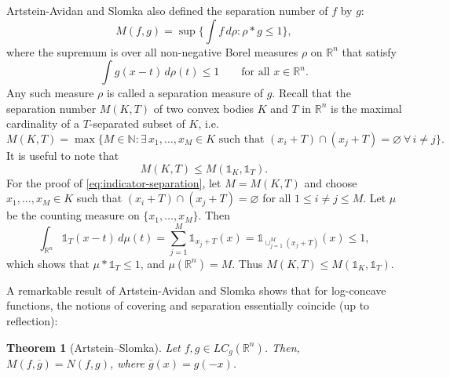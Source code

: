 \documentclass[11pt,leqno]{article}
\newtheorem{theorem}{Theorem}[section]
\theoremstyle{definition}
\theoremstyle{remark}
\numberwithin{equation}{section}
\newcommand{\ls}{\leqslant}
\begin{document}
Artstein-Avidan and Slomka \cite{Artstein-Slomka-2021} also defined the separation number of $f$ by $g$:
$$M(f,g)= \sup\Big\{\int f\, d\rho : \rho\ast g \ls 1\Big\},$$
where the supremum is over all non-negative Borel measures $\rho$ on $\mathbb{R}^n$ that satisfy
$$\int g(x-t)\, d\rho(t)\ls 1\qquad \text{for all } x\in\mathbb{R}^n.$$
Any such measure $\rho$ is called a separation measure of $g$.
Recall that the separation number $M(K,T)$ of two convex bodies $K$ and $T$ in
$\mathbb{R}^n$ is the maximal cardinality of a $T$-separated subset of $K$, i.e.
$$M(K,T)= \max\Big\{ M\in\mathbb{N} :\exists\, x_1,\ldots,x_M \in K
\text{ such that }(x_i+T)\cap(x_j+T)=\varnothing\ \forall\, i\neq j\Big\}.$$
It is useful to note that
\begin{equation}\label{eq:indicator-separation}
M(K,T)\ls M(\mathds{1}_K,\mathds{1}_T).
\end{equation}
For the proof of \eqref{eq:indicator-separation}, let $M=M(K,T)$ and choose
$x_1,\ldots ,x_M\in K$ such that $(x_i+T)\cap(x_j+T)=\varnothing$ for all $1\ls i\neq j\ls M$.
Let $\mu$ be the counting measure on $\{x_1,\ldots,x_M\}$. Then
$$\int_{\mathbb{R}^n}\mathds{1}_T(x-t)\, d\mu(t)= \sum_{j=1}^M \mathds{1}_{x_j+T}(x)
= \mathds{1}_{\cup_{j=1}^M (x_j+T)}(x)\ls 1,$$
which shows that $\mu\ast\mathds{1}_T\ls 1$, and $\mu(\mathbb{R}^n)=M$.
Thus $M(K,T)\ls M(\mathds{1}_K,\mathds{1}_T)$.

\smallskip

A remarkable result of Artstein-Avidan and Slomka \cite{Artstein-Slomka-2021} shows that for log-concave functions, 
the notions of covering and separation essentially coincide (up to reflection):

\begin{theorem}[Artstein--Slomka]
Let $f, g\in LC_g(\mathbb{R}^n)$. Then, $M(f,\overline{g}) = N(f,g)$, where $\overline{g}(x)=g(-x)$.
\end{theorem}
\end{document}

